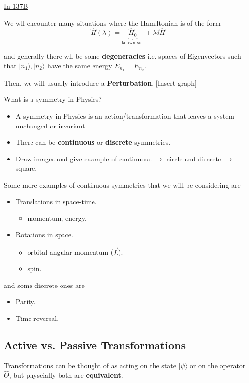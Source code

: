 \documentclass{article}
\newcommand{\ket}[1]{|#1 \rangle}
\begin{document}
\vskip 0.5cm
\underline{In 137B}
 
We wll encounter many situations where the Hamiltonian is of the form 
\[  \hat{H}(\lambda) = \underbrace{\hat{H}_0}_{\text{known sol.}} + \lambda \delta \hat{H}\]

and generally there wll be some \textbf{degeneracies} i.e. spaces of Eigenvectors such that $\ket{n_1}, \ket{n_2}$ have the same energy $E_{n_1} = E_{n_2}$.

\vskip 0.5cm
Then, we will usually introduce a \textbf{Perturbation}. [Insert graph]

\vskip 0.5cm
\begin{mathdefinitionbox}{What is a symmetry in Physics?}
  \begin{itemize}
    \item A symmetry in Physics is an action/transformation that leaves a system unchanged or invariant.
    \item There can be \textbf{continuous} or \textbf{discrete} symmetries.
    \item Draw images and give example of continuous $\rightarrow$ circle and discrete $\rightarrow$ square.
  \end{itemize}
\end{mathdefinitionbox}

\vskip 0.5cm
Some more examples of continuous symmetries that we will be considering are 
\begin{itemize}
  \item Translations in space-time.
  \begin{itemize}
    \item momentum, energy.
  \end{itemize}
  \item Rotations in space.
  \begin{itemize}
    \item orbital angular momentum ($\vec{L}$).
    \item spin.
  \end{itemize}
\end{itemize}
and some discrete ones are 
\begin{itemize}
  \item Parity.
  \item Time reversal.
\end{itemize}

\vskip 1cm
\subsection*{Active vs. Passive Transformations}
Transformations can be thought of as acting on the state $\ket{\psi}$ or on the operator $\hat{\Theta}$, but physcially both are \textbf{equivalent}. 
\end{document}
